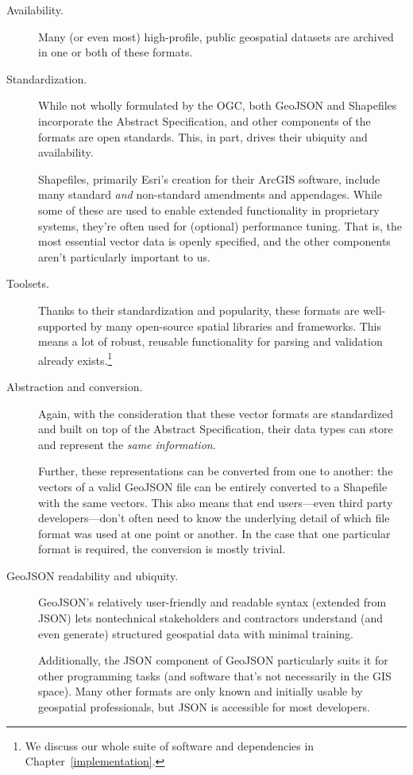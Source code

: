 \begin{description}
  \item[Availability.] Many (or even most) high-profile, public geospatial datasets are archived in one or both of these formats.
  \item[Standardization.] While not wholly formulated by the OGC, both GeoJSON and Shapefiles incorporate the Abstract Specification, and other components of the formats are open standards. This, in part, drives their ubiquity and availability.
  
Shapefiles, primarily Esri's creation for their ArcGIS software, include many standard \textit{and} non-standard amendments and appendages. While some of these are used to enable extended functionality in proprietary systems, they're often used for (optional) performance tuning. That is, the most essential vector data is openly specified, and the other components aren't particularly important to us.

\item[Toolsets.] Thanks to their standardization and popularity, these formats  are well-supported by many open-source spatial libraries and frameworks. This means a lot of robust, reusable functionality for parsing and validation already exists.\footnote{We discuss our whole suite of software and dependencies in Chapter~\ref{implementation}.}

\item[Abstraction and conversion.] Again, with the consideration that these vector formats are standardized and built on top of the Abstract Specification, their data types can store and represent the \textit{same information}.

Further, these representations can be converted from one to another: the vectors of a valid GeoJSON file can be entirely converted to a Shapefile with the same vectors. This also means that end users---even third party developers---don't often need to know the underlying detail of which file format was used at one point or another. In the case that one particular format is required, the conversion is mostly trivial.

\item[GeoJSON readability and ubiquity.] GeoJSON's relatively user-friendly and readable syntax (extended from JSON) lets nontechnical stakeholders and contractors understand (and even generate) structured geospatial data with minimal training.

Additionally, the JSON component of GeoJSON particularly suits it for other programming tasks (and software that's not necessarily in the GIS space). Many other formats are only known and initially usable by geospatial professionals, but JSON is accessible for most developers.

\end{description}

